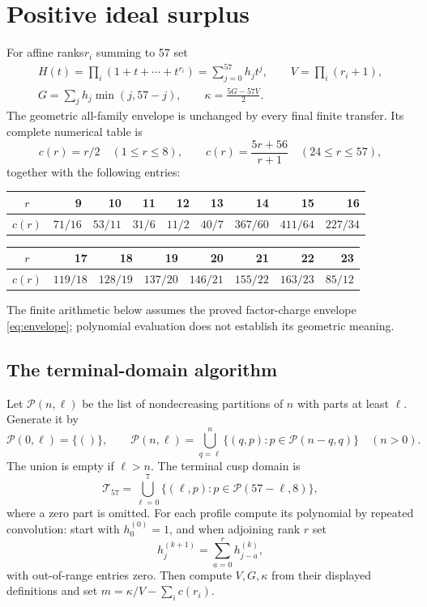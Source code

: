 \documentclass[11pt]{article}
\theoremstyle{remark}\newtheorem{remark}[theorem]{Remark}
\begin{document}
\section{Positive ideal surplus}\label{sec:ideal}
For affine ranks$r_i$ summing to 57 set
\[
 \begin{gathered}
 H(t)=\prod_i(1+t+\cdots+t^{r_i})=\sum_{j=0}^{57}h_jt^j,
 \qquad V=\prod_i(r_i+1),\\
 G=\sum_jh_j\min(j,57-j),\qquad\kappa=\frac{5G-57V}{2}.
 \end{gathered}
\]
The geometric all-family envelope is unchanged by every final finite
transfer. Its complete numerical table is
\[
 c(r)=r/2\quad(1\le r\le8),\qquad
 c(r)=\frac{5r+56}{r+1}\quad(24\le r\le57),
\]
together with the following entries:
\begin{center}\small
\begin{tabular}{c|rrrrrrrr}
$r$&9&10&11&12&13&14&15&16\\\hline
$c(r)$&$71/16$&$53/11$&$31/6$&$11/2$&$40/7$&$367/60$&$411/64$&$227/34$
\end{tabular}
\medskip
\begin{tabular}{c|rrrrrrr}
$r$&17&18&19&20&21&22&23\\\hline
$c(r)$&$119/18$&$128/19$&$137/20$&$146/21$&$155/22$&$163/23$&$85/12$
\end{tabular}
\end{center}
The finite arithmetic below assumes the proved factor-charge envelope
\eqref{eq:envelope}; polynomial evaluation does not establish its
geometric meaning.

\subsection{The terminal-domain algorithm}

Let $\mathcal P(n,\ell)$ be the list of nondecreasing partitions of
$n$ with parts at least $\ell$. Generate it by
\[
 \mathcal P(0,\ell)=\{()\},\qquad
 \mathcal P(n,\ell)=\bigcup_{q=\ell}^{n}
       \{(q,p):p\in\mathcal P(n-q,q)\}\quad(n>0).
\]
The union is empty if $\ell>n$. The terminal cusp domain is
\begin{equation}\label{eq:terminal-domain}
 \mathcal T_{57}=\bigcup_{\ell=0}^{7}
       \{(\ell,p):p\in\mathcal P(57-\ell,8)\},
\end{equation}
where a zero part is omitted. For each profile compute its polynomial
by repeated convolution: start with $h^{(0)}_0=1$, and when adjoining
rank $r$ set
\[
 h^{(k+1)}_j=\sum_{a=0}^{r}h^{(k)}_{j-a},
\]
with out-of-range entries zero. Then compute $V,G,\kappa$ from their
displayed definitions and set $m=\kappa/V-\sum_i c(r_i)$.
\end{document}
